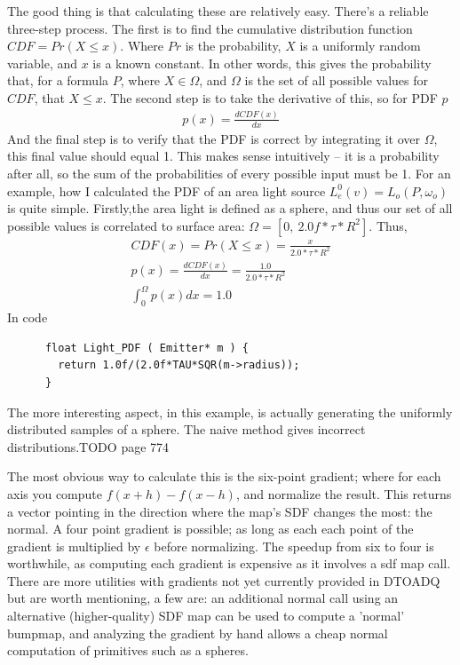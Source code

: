 \documentclass{article}
\begin{document}
    The good thing is that calculating these are relatively easy. There's a
    reliable three-step process. The first is to
    find the cumulative distribution function $CDF = Pr(X \leq x)$. Where $Pr$
    is the probability, $X$ is a uniformly random variable, and $x$ is a known
    constant. In other words, this gives the probability that, for a formula
    $P$, where $X \in \Omega$, and $\Omega$ is the set of all possible values
    for $CDF$,
    that $X \leq x$. The second step is to take the derivative of this, so for
    PDF $p$
    \begin{align}
      p(x) = \frac{dCDF(x)}{dx}
    \end{align}
    And the final step is to verify that the PDF is correct by integrating it
    over $\Omega$, this final value should equal 1. This makes sense intuitively
    -- it is a probability after all, so the sum of the probabilities of every
    possible input must be 1.
    For an example, how I calculated the PDF of an area light source
      $L^0_e(v) = L_o(P, \omega_o)$ 
    is quite simple. Firstly,the area light is defined as a sphere, and thus our
    set of all possible values is correlated to surface area:
    $\Omega = [0,\:2.0f*\tau*R^2]$. Thus,
    \begin{align}
      CDF(x) = Pr(X \leq x) = \frac{x}{2.0*\tau*R^2}\\
      p(x) = \frac{dCDF(x)}{dx} = \frac{1.0}{2.0*\tau*R^2}\\
      \int_0^{\Omega}p(x)dx = 1.0
    \end{align}
    In code
    \begin{lstlisting}
      float Light_PDF ( Emitter* m ) {
        return 1.0f/(2.0f*TAU*SQR(m->radius));
      }
    \end{lstlisting}
    The more interesting aspect, in this example, is actually generating the
    uniformly distributed samples of a sphere. The naive method gives incorrect
    distributions.TODO {page 774}
    
    The most obvious way to calculate this is the six-point gradient; where for
    each axis you compute $f(x+h) - f(x-h)$, and normalize the result. This
    returns a vector pointing in the direction where the map's SDF changes the
    most: the normal. A four point gradient is possible; as long as each each
    point of the gradient is multiplied by $\epsilon$ before normalizing. The
    speedup from six to four is worthwhile, as computing each gradient is
    expensive as it involves a sdf map call. There are more utilities with
    gradients not yet currently provided in DTOADQ but are worth mentioning, a
    few are: an additional normal call using an alternative (higher-quality) SDF
    map can be used to compute a 'normal' bumpmap, and analyzing the gradient by
    hand allows a cheap normal computation of primitives such as a spheres.
  
\end{document}
